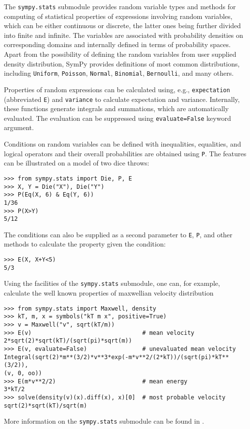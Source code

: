 The \verb|sympy.stats| submodule provides random variable types and methods for
computing of statistical properties of expressions involving random
variables, which can be either continuous or discrete, the latter ones being
further divided into finite and infinite. The variables are associated
with probability densities on corresponding domains and internally defined
in terms of probability spaces.
Apart from the possibility of defining the random variables from user supplied
density distribution, SymPy provides definitions of most common
distributions, including \texttt{Uniform}, \texttt{Poisson}, \texttt{Normal},
\texttt{Binomial}, \texttt{Bernoulli}, and many others.

Properties of random expressions can be calculated using, e.g.,
\texttt{expectation} (abbreviated \texttt{E}) and \texttt{variance} to
calculate expectation and variance. Internally, these functions generate
integrals and summations, which are automatically evaluated. The evaluation
can be suppressed using \texttt{evaluate=False} keyword argument.

Conditions on random variables can be defined with inequalities, equalities,
and logical operators and their overall probabilities are obtained using
\texttt{P}. The features can be illustrated on a model of two dice throws:
\begin{verbatim}
>>> from sympy.stats import Die, P, E
>>> X, Y = Die("X"), Die("Y")
>>> P(Eq(X, 6) & Eq(Y, 6))
1/36
>>> P(X>Y)
5/12
\end{verbatim}
The conditions can also be supplied as a second parameter to \texttt{E},
\texttt{P}, and other methods to calculate the property given the condition:
\begin{verbatim}
>>> E(X, X+Y<5)
5/3
\end{verbatim}

Using the facilities of the \texttt{sympy.stats} submodule, one can, for
example, calculate
the well known properties of maxwellian velocity distribution
\begin{verbatim}
>>> from sympy.stats import Maxwell, density
>>> kT, m, x = symbols("kT m x", positive=True)
>>> v = Maxwell("v", sqrt(kT/m))
>>> E(v)                                # mean velocity
2*sqrt(2)*sqrt(kT)/(sqrt(pi)*sqrt(m))
>>> E(v, evaluate=False)                # unevaluated mean velocity
Integral(sqrt(2)*m**(3/2)*v**3*exp(-m*v**2/(2*kT))/(sqrt(pi)*kT**(3/2)),
(v, 0, oo))
>>> E(m*v**2/2)                         # mean energy
3*kT/2
>>> solve(density(v)(x).diff(x), x)[0]  # most probable velocity
sqrt(2)*sqrt(kT)/sqrt(m)
\end{verbatim}

More information on the \texttt{sympy.stats} submodule can be found in
\cite{StatsMRocklin}.
